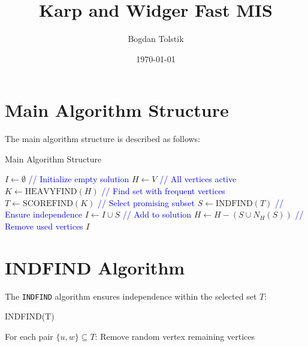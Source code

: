 \documentclass{article}
\title{Karp and Widger Fast MIS}
\author{Bogdan Tolstik}
\date{\today}
\begin{document}
\maketitle

\section*{Main Algorithm Structure}

The main algorithm structure is described as follows:

\begin{algorithm}[H]
    \caption{Main Algorithm Structure}
    \begin{algorithmic}[1]
        \STATE $I \leftarrow \emptyset$ \hfill \textcolor{blue}{// Initialize empty solution}
        \STATE $H \leftarrow V$ \hfill \textcolor{blue}{// All vertices active}
            \STATE $K \leftarrow \text{HEAVYFIND}(H)$ \hfill \textcolor{blue}{// Find set with frequent vertices}
            \STATE $T \leftarrow \text{SCOREFIND}(K)$ \hfill \textcolor{blue}{// Select promising subset}
            \STATE $S \leftarrow \text{INDFIND}(T)$ \hfill \textcolor{blue}{// Ensure independence}
            \STATE $I \leftarrow I \cup S$ \hfill \textcolor{blue}{// Add to solution}
            \STATE $H \leftarrow H - (S \cup N_H(S))$ \hfill \textcolor{blue}{// Remove used vertices}
        \ENDWHILE
        \RETURN $I$
    \end{algorithmic}
\end{algorithm}

\section*{INDFIND Algorithm}

The \texttt{INDFIND} algorithm ensures independence within the selected set $T$:

\begin{algorithm}[H]
    \caption{INDFIND(T)}
    \begin{algorithmic}[1]
        \STATE For each pair $\{u,w\} \subseteq T$:
            \STATE Remove random vertex
        \ENDIF
        \RETURN remaining vertices
    \end{algorithmic}
\end{algorithm}
\end{document}
